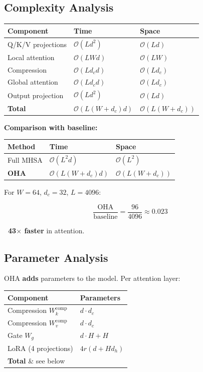 \subsection{Complexity Analysis}

\begin{table}[H]
\centering
\small
\begin{tabular}{lll}
\toprule
\textbf{Component} & \textbf{Time} & \textbf{Space} \\
\midrule
Q/K/V projections & $\mathcal{O}(L d^2)$ & $\mathcal{O}(L d)$ \\
Local attention & $\mathcal{O}(L W d)$ & $\mathcal{O}(L W)$ \\
Compression & $\mathcal{O}(L d_c d)$ & $\mathcal{O}(L d_c)$ \\
Global attention & $\mathcal{O}(L d_c d)$ & $\mathcal{O}(L d_c)$ \\
Output projection & $\mathcal{O}(L d^2)$ & $\mathcal{O}(L d)$ \\
\textbf{Total} & $\mathcal{O}(L(W + d_c) d)$ & $\mathcal{O}(L(W + d_c))$ \\
\bottomrule
\end{tabular}
\end{table}

\textbf{Comparison with baseline:}

\begin{table}[H]
\centering
\small
\begin{tabular}{lll}
\toprule
\textbf{Method} & \textbf{Time} & \textbf{Space} \\
\midrule
Full MHSA & $\mathcal{O}(L^2 d)$ & $\mathcal{O}(L^2)$ \\
\textbf{OHA} & $\mathcal{O}(L(W + d_c) d)$ & $\mathcal{O}(L(W + d_c))$ \\
\bottomrule
\end{tabular}
\end{table}

For $W = 64$, $d_c = 32$, $L = 4096$: 

\[
\frac{\text{OHA}}{\text{baseline}} = \frac{96}{4096} \approx 0.023
\]

\textbf{~43$\times$ faster} in attention.

\subsection{Parameter Analysis}

OHA \textbf{adds} parameters to the model. Per attention layer:

\begin{table}[H]
\centering
\small
\begin{tabular}{ll}
\toprule
\textbf{Component} & \textbf{Parameters} \\
\midrule
Compression $W_k^\text{comp}$ & $d \cdot d_c$ \\
Compression $W_v^\text{comp}$ & $d \cdot d_c$ \\
Gate $W_g$ & $d \cdot H + H$ \\
LoRA (4 projections) & $4 r(d + H d_h)$ \\
\textbf{Total} \& see below \\
\bottomrule
\end{tabular}
\end{table}

